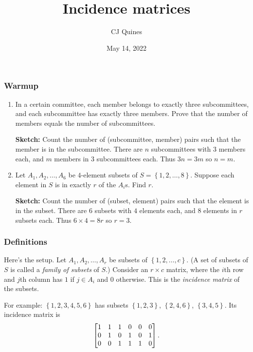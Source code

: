 \documentclass[11pt,paper=letter]{scrartcl}
\begin{document}
\title{Incidence matrices}
\author{CJ Quines}
\date{May 14, 2022}

\maketitle

\subsubsection*{Warmup}

\begin{enumerate}

\item In a certain committee, each member belongs to exactly three subcommittees, and each subcommittee has exactly three members. Prove that the number of members equals the number of subcommittees.

\textbf{Sketch:} Count the number of (subcommittee, member) pairs such that the member is in the subcommittee. There are $n$ subcommittees with $3$ members each, and $m$ members in $3$ subcommittees each. Thus $3n = 3m$ so $n = m$.

\item Let $A_1, A_2, \ldots, A_6$ be $4$-element subsets of $S = \left\{ 1, 2, \ldots, 8 \right\}$. Suppose each element in $S$ is in exactly $r$ of the $A_i$s. Find $r$.

\textbf{Sketch:} Count the number of (subset, element) pairs such that the element is in the subset. There are $6$ subsets with $4$ elements each, and $8$ elements in $r$ subsets each. Thus $6 \times 4 = 8r$ so $r = 3$.

\end{enumerate}

\subsubsection*{Definitions}

Here's the setup. Let $ A_1, A_2, \ldots, A_r $ be subsets of $ \left\{ 1, 2, \ldots, c \right\} $. (A set of subsets of $S$ is called a \textit{family of subsets} of $S$.) Consider an $ r \times c $ matrix, where the $i$th row and $j$th column has $1$ if $j \in A_i$ and $0$ otherwise. This is the \textit{incidence matrix} of the subsets.

For example: $ \left\{ 1, 2, 3, 4, 5, 6 \right\} $ has subsets $\left\{ 1, 2, 3 \right\}$, $\left\{ 2, 4, 6 \right\}$, $\left\{ 3, 4, 5 \right\}$. Its incidence matrix is \[
  \begin{bmatrix}1 & 1 & 1 & 0 & 0 & 0 \\ 0 & 1 & 0 & 1 & 0 & 1 \\ 0 & 0 & 1 & 1 & 1 & 0\end{bmatrix}.
\]
\end{document}
